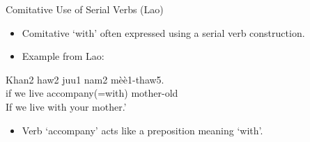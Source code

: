 \documentclass{beamer}
\begin{document}
\begin{frame}{Comitative Use of Serial Verbs (Lao)}
\begin{itemize}
    \item Comitative ‘with’ often expressed using a serial verb construction.
    \item Example from Lao:
\end{itemize}
\begin{exe}
\ex
\gll Khan2 haw2 juu1 nam2 mèè1-thaw5. \\
    if we live accompany(=with) mother-old \\
\trans If we live with your mother.’\\
\end{exe}
\begin{itemize}
    \item Verb ‘accompany’ acts like a preposition meaning ‘with’.
\end{itemize}
\end{frame}
\end{document}

